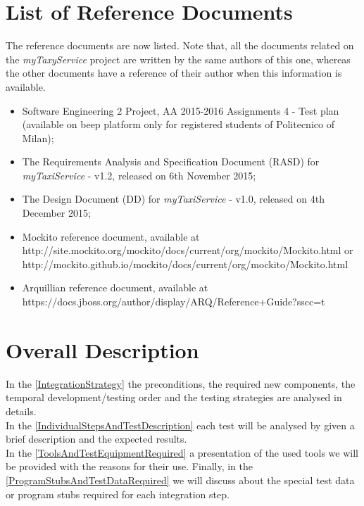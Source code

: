 \documentclass[\mainpath/main]{subfiles}
\begin{document}
\section{List of Reference Documents}
\label{Introduction:ReferenceDocuments}
The reference documents are now listed. Note that, all the documents related on the \textit{myTaxyService} project are written by the same authors of this one, whereas the other documents have a reference of their author when this information is available.\\
\begin{itemize}
	\item Software Engineering 2 Project, AA 2015-2016 Assignments 4 - Test plan (available on beep platform only for registered students of Politecnico of Milan);
	\item The Requirements Analysis and Specification Document (RASD) for \textit{myTaxiService} - v1.2, released on 6th November 2015;
	\item The Design Document (DD) for \textit{myTaxiService} - v1.0, released on 4th December 2015;
	\item Mockito reference document, available at\\ \small{http://site.mockito.org/mockito/docs/current/org/mockito/Mockito.html} or\\ \small{http://mockito.github.io/mockito/docs/current/org/mockito/Mockito.html}
	\item Arquillian reference document, available at\\
	\small{https://docs.jboss.org/author/display/ARQ/Reference+Guide?\textunderscore sscc=t}
\end{itemize}

\section{Overall Description}
\label{Introduction:Overall}
In the \autoref{IntegrationStrategy} the preconditions, the required new components, the temporal development/testing order and the testing strategies are analysed in details.\\
In the \autoref{IndividualStepsAndTestDescription} each test will be analysed by given a brief description and the expected results.\\
In the \autoref{ToolsAndTestEquipmentRequired} a presentation of the used tools we will be provided with the reasons for their use. Finally, in the \autoref{ProgramStubsAndTestDataRequired} we will discuss about the special test data or program stubs required for each integration step.
\end{document}
